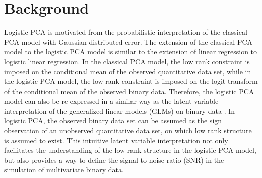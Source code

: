 \section{Background}
Logistic PCA \cite{schein2003generalized,de2006principal} is motivated from the probabilistic interpretation of the classical PCA model with Gaussian distributed error. The extension of the classical PCA model to the logistic PCA model is similar to the extension of linear regression to logistic linear regression. In the classical PCA model, the low rank constraint is imposed on the conditional mean of the observed quantitative data set, while in the logistic PCA model, the low rank constraint is imposed on the logit transform of the conditional mean of the observed binary data. Therefore, the logistic PCA model can also be re-expressed in a similar way as the latent variable interpretation of the generalized linear models (GLMs) on binary data \cite{agresti2013categorical}. In logistic PCA, the observed binary data set can be assumed as the sign observation of an unobserved quantitative data set, on which low rank structure is assumed to exist. This intuitive latent variable interpretation not only facilitates the understanding of the low rank structure in the logistic PCA model, but also provides a way to define the signal-to-noise ratio (SNR) in the simulation of multivariate binary data.

